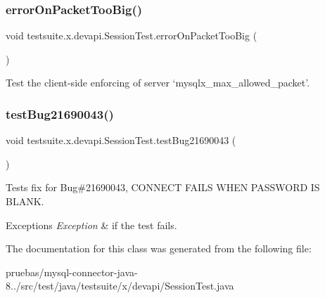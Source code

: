 \subsubsection{\texorpdfstring{error\+On\+Packet\+Too\+Big()}{errorOnPacketTooBig()}}
{\footnotesize\ttfamily void testsuite.\+x.\+devapi.\+Session\+Test.\+error\+On\+Packet\+Too\+Big (\begin{DoxyParamCaption}{ }\end{DoxyParamCaption})}

Test the client-\/side enforcing of server `mysqlx\+\_\+max\+\_\+allowed\+\_\+packet'. \mbox{\label{classtestsuite_1_1x_1_1devapi_1_1_session_test_a6ebdd3c58a18e1b8b58788a16c7b4b46}} 
\subsubsection{\texorpdfstring{test\+Bug21690043()}{testBug21690043()}}
{\footnotesize\ttfamily void testsuite.\+x.\+devapi.\+Session\+Test.\+test\+Bug21690043 (\begin{DoxyParamCaption}{ }\end{DoxyParamCaption})}

Tests fix for Bug\#21690043, C\+O\+N\+N\+E\+CT F\+A\+I\+LS W\+H\+EN P\+A\+S\+S\+W\+O\+RD IS B\+L\+A\+NK.


\begin{DoxyExceptions}{Exceptions}
{\em Exception} & if the test fails. \\
\hline
\end{DoxyExceptions}


The documentation for this class was generated from the following file\+:\begin{DoxyCompactItemize}
\item 
pruebas/mysql-\/connector-\/java-\/8../src/test/java/testsuite/x/devapi/Session\+Test.\+java\end{DoxyCompactItemize}
